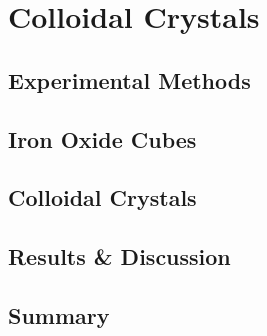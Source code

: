 \documentclass[\main/dresen_thesis.tex]{subfiles}
\renewcommand{\thisPath}{\main/chapters/colloidalCrystals}
\begin{document}
\chapter{Colloidal Crystals}\label{ch:colloidalCrystals}

  
  \FloatBarrier
  \clearpage

  \section{Experimental Methods}
    
      \FloatBarrier
      \clearpage

  \section{Iron Oxide Cubes}
    
      \FloatBarrier
      \clearpage

  \section{Colloidal Crystals}
    
    \FloatBarrier
      \clearpage

  \section{Results \& Discussion}
    \FloatBarrier
      \clearpage

  \section{Summary}
    
    \FloatBarrier
\end{document}
